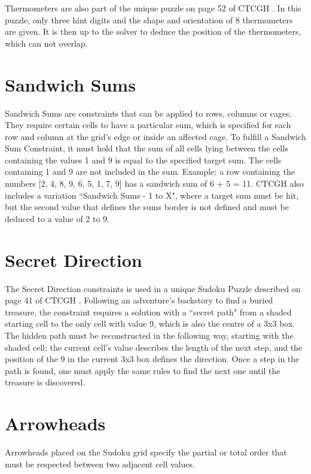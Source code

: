Thermometers are also part of the unique puzzle on page 52 of CTCGH \cite{CrackingTheCryptic2021}. In this puzzle, only three hint digits and the shape and orientation of 8 thermometers are given. It is then up to the solver to deduce the position of the thermometers, which can not overlap.

\section{Sandwich Sums}
Sandwich Sums are constraints that can be applied to rows, columns or cages. They require certain cells to have a particular sum, which is specified for each row and column at the grid's edge or inside an affected cage. To fulfill a Sandwich Sum Constraint, it must hold that the sum of all cells lying between the cells containing the values 1 and 9 is equal to the specified target sum. The cells containing 1 and 9 are not included in the sum. Example: a row containing the numbers [2, 4, 8, 9, 6, 5, 1, 7, 9] has a sandwich sum of 6 + 5 = 11. CTCGH \cite{CrackingTheCryptic2021} also includes a variation ``Sandwich Sums - 1 to X", where a target sum must be hit, but the second value that defines the sums border is not defined and must be deduced to a value of 2 to 9.

\section{Secret Direction}
The Secret Direction constraints is used in a unique Sudoku Puzzle described on page 41 of CTCGH \cite{CrackingTheCryptic2021}. Following an adventure's backstory to find a buried treasure, the constraint requires a solution with a ``secret path" from a shaded starting cell to the only cell with value 9, which is also the centre of a 3x3 box. The hidden path must be reconstructed in the following way, starting with the shaded cell; the current cell's value describes the length of the next step, and the position of the 9 in the current 3x3 box defines the direction. Once a step in the path is found, one must apply the same rules to find the next one until the treasure is discovered.

\section{Arrowheads}
Arrowheads placed on the Sudoku grid specify the partial or total order that must be respected between two adjacent cell values.


